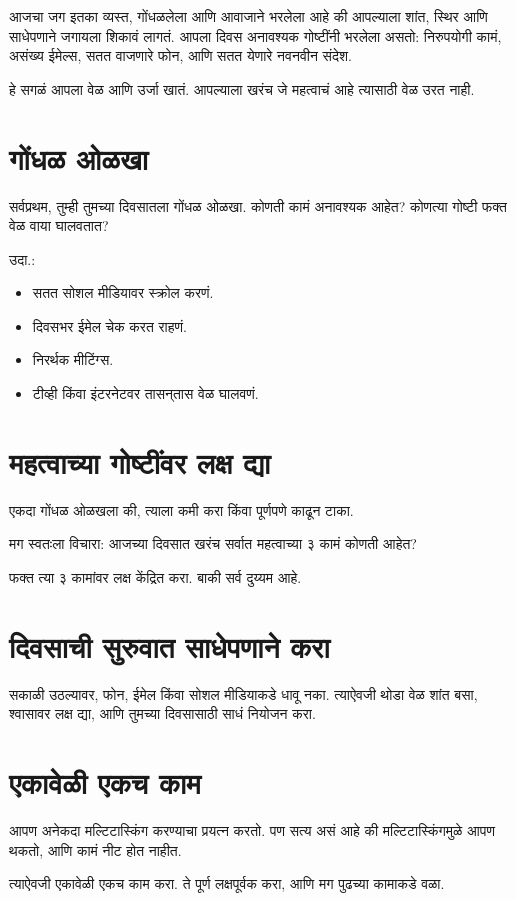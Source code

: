 आजचा जग इतका व्यस्त, गोंधळलेला आणि आवाजाने भरलेला आहे की  
आपल्याला शांत, स्थिर आणि साधेपणाने जगायला शिकावं लागतं.  
आपला दिवस अनावश्यक गोष्टींनी भरलेला असतो:  
निरुपयोगी कामं, असंख्य ईमेल्स,  
सतत वाजणारे फोन,  
आणि सतत येणारे नवनवीन संदेश.  

हे सगळं आपला वेळ आणि उर्जा खातं.  
आपल्याला खरंच जे महत्वाचं आहे त्यासाठी वेळ उरत नाही.  

\section*{गोंधळ ओळखा}
सर्वप्रथम, तुम्ही तुमच्या दिवसातला गोंधळ ओळखा.  
कोणती कामं अनावश्यक आहेत?  
कोणत्या गोष्टी फक्त वेळ वाया घालवतात?  

उदा.:  
\begin{itemize}
\item सतत सोशल मीडियावर स्क्रोल करणं.  
\item दिवसभर ईमेल चेक करत राहणं.  
\item निरर्थक मीटिंग्स.  
\item टीव्ही किंवा इंटरनेटवर तासन्‌तास वेळ घालवणं.  
\end{itemize}

\section*{महत्वाच्या गोष्टींवर लक्ष द्या}
एकदा गोंधळ ओळखला की,  
त्याला कमी करा किंवा पूर्णपणे काढून टाका.  

मग स्वतःला विचारा:  
आजच्या दिवसात खरंच सर्वात महत्वाच्या ३ कामं कोणती आहेत?  

फक्त त्या ३ कामांवर लक्ष केंद्रित करा.  
बाकी सर्व दुय्यम आहे.  

\section*{दिवसाची सुरुवात साधेपणाने करा}
सकाळी उठल्यावर,  
फोन, ईमेल किंवा सोशल मीडियाकडे धावू नका.  
त्याऐवजी थोडा वेळ शांत बसा,  
श्वासावर लक्ष द्या,  
आणि तुमच्या दिवसासाठी साधं नियोजन करा.  

\section*{एकावेळी एकच काम}
आपण अनेकदा मल्टिटास्किंग करण्याचा प्रयत्न करतो.  
पण सत्य असं आहे की मल्टिटास्किंगमुळे आपण थकतो,  
आणि कामं नीट होत नाहीत.  

त्याऐवजी एकावेळी एकच काम करा.  
ते पूर्ण लक्षपूर्वक करा,  
आणि मग पुढच्या कामाकडे वळा.  

